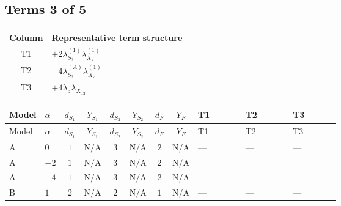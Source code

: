 \documentclass[8pt]{article}
\begin{document}
\begin{landscape}
\subsection*{Terms 3 of 5}
\begin{center}
\begin{tabular}{@{}c >{\raggedright\arraybackslash}p{0.82\linewidth}@{}}
\toprule
Column & Representative term structure \\
\midrule
T1 & \(\displaystyle +2 {\lambda_{S_2}^{(1)}} {\lambda_{X_{7}}^{(1)}}\) \\
\midrule
T2 & \(\displaystyle -4 {\lambda_{S_2}^{(A)}} {\lambda_{X_{7}}^{(1)}}\) \\
\midrule
T3 & \(\displaystyle +4 {\lambda_5} {\lambda_{X_{12}}}\) \\
\midrule
\bottomrule
\end{tabular}
\end{center}
\smallskip
\tiny
\begin{longtable}{@{}llcccccc >{\raggedright\arraybackslash}p{0.21\linewidth} >{\raggedright\arraybackslash}p{0.21\linewidth} >{\raggedright\arraybackslash}p{0.21\linewidth}@{}}
\toprule
Model & $\alpha$ & $d_{S_1}$ & $Y_{S_1}$ & $d_{S_2}$ & $Y_{S_2}$ & $d_F$ & $Y_F$ & T1 & T2 & T3 \\
\midrule
\endfirsthead
\toprule
Model & $\alpha$ & $d_{S_1}$ & $Y_{S_1}$ & $d_{S_2}$ & $Y_{S_2}$ & $d_F$ & $Y_F$ & T1 & T2 & T3 \\
\midrule
\endhead
A & $0$ & $1$ & $\text{N/A}$ & $3$ & $\text{N/A}$ & $2$ & $\text{N/A}$ & --- & --- & --- \\
\midrule
A & $-2$ & $1$ & $\text{N/A}$ & $3$ & $\text{N/A}$ & $2$ & $\text{N/A}$ & \scriptsize\adjustbox{max width=\linewidth}{$\begin{gathered} +2 {\lambda_{S_2}^{(1)}} {\lambda_{X_{7}}^{(1)}}\end{gathered}$} & \scriptsize\adjustbox{max width=\linewidth}{$\begin{gathered} -4 {\lambda_{S_2}^{(A)}} {\lambda_{X_{7}}^{(1)}}\end{gathered}$} & \scriptsize\adjustbox{max width=\linewidth}{$\begin{gathered} +4 {\lambda_5} {\lambda_{X_{12}}}\end{gathered}$} \\
\midrule
A & $-4$ & $1$ & $\text{N/A}$ & $3$ & $\text{N/A}$ & $2$ & $\text{N/A}$ & --- & --- & --- \\
\midrule
B & $1$ & $2$ & $\text{N/A}$ & $2$ & $\text{N/A}$ & $1$ & $\text{N/A}$ & --- & --- & --- \\

\end{longtable}
\end{landscape}
\end{document}
